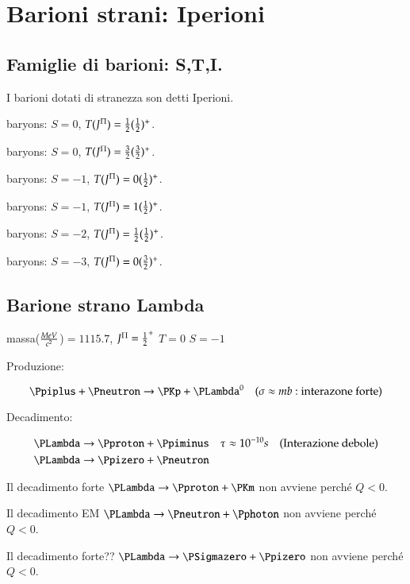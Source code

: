 \documentclass[main.tex]{subfiles}
\begin{document}
\section{Barioni strani: Iperioni}

\subsection{Famiglie di barioni: S,T,I.}
I barioni dotati di stranezza son detti Iperioni. 

 

\begin{itemize*}
\item \PN baryons: $S=0$, $T(J^{\Pi})=\frac{1}{2}(\frac{1}{2})^+$.
\item \PDelta baryons: $S=0$, $T(J^{\Pi})=\frac{3}{2}(\frac{3}{2})^+$.
\item \PLambda baryons: $S=-1$, $T(J^{\Pi})=0(\frac{1}{2})^+$.
\item \PSigma baryons: $S=-1$, $T(J^{\Pi})=1(\frac{1}{2})^+$.
\item \PXi baryons: $S=-2$, $T(J^{\Pi})=\frac{1}{2}(\frac{1}{2})^+$.
\item \PXi baryons: $S=-3$, $T(J^{\Pi})=0(\frac{3}{2})^+$.
\end{itemize*}

\subsection{Barione strano Lambda}

\begin{itemize*}
\item massa($\frac{MeV}{c^2}$)$=1115.7$, $J^{\Pi}=\frac{1}{2}^+$ $T=0$ $S=-1$
\item Produzione:

\begin{equation*}
\Ppiplus+\Pneutron\rightarrow\PKp+\PLambda^0\quad(\sigma\approx mb: \text{interazone forte})
\end{equation*}

\item Decadimento:

\begin{align*}
&\PLambda\rightarrow\Pproton+\Ppiminus\quad \tau\approx10^{-10}s\quad (\text{Interazione debole})\\
&\PLambda\rightarrow\Ppizero+\Pneutron
\end{align*}

Il decadimento forte $\PLambda\to\Pproton+\PKm$ non avviene perch\'e $Q<0$.

Il decadimento EM $\PLambda\to\Pneutron+\Pphoton$ non avviene perch\'e $Q<0$.

Il decadimento forte?? $\PLambda\to\PSigmazero+\Ppizero$ non avviene perch\'e $Q<0$.

\end{itemize*}
\end{document}
